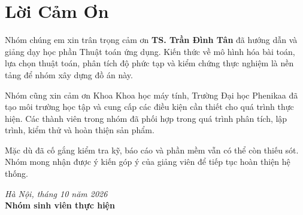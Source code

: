 \chapter*{Lời Cảm Ơn}

Nhóm chúng em xin trân trọng cảm ơn \textbf{TS. Trần Đình Tân} đã hướng dẫn và
giảng dạy học phần Thuật toán ứng dụng. Kiến thức về mô hình hóa bài toán, lựa
chọn thuật toán, phân tích độ phức tạp và kiểm chứng thực nghiệm là nền tảng để
nhóm xây dựng đồ án này.

Nhóm cũng xin cảm ơn Khoa Khoa học máy tính, Trường Đại học Phenikaa đã tạo môi
trường học tập và cung cấp các điều kiện cần thiết cho quá trình thực hiện. Các
thành viên trong nhóm đã phối hợp trong quá trình phân tích, lập trình, kiểm thử
và hoàn thiện sản phẩm.

Mặc dù đã cố gắng kiểm tra kỹ, báo cáo và phần mềm vẫn có thể còn thiếu sót.
Nhóm mong nhận được ý kiến góp ý của giảng viên để tiếp tục hoàn thiện hệ thống.

\begin{flushright}
\textit{Hà Nội, tháng 10 năm 2026}\\[0.5cm]
\textbf{Nhóm sinh viên thực hiện}
\end{flushright}
\clearpage
